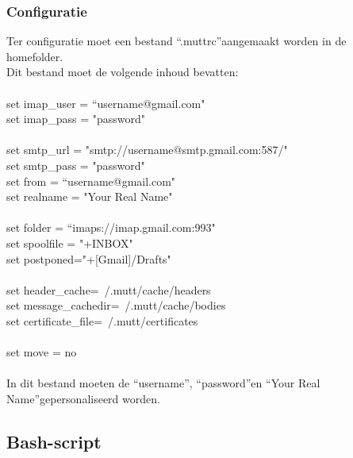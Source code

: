 \documentclass[12pt]{article}
\begin{document}
				\subsubsection{Configuratie}
					Ter configuratie moet een bestand \textquotedblleft .muttrc\textquotedblright aangemaakt worden in de homefolder.\\
					Dit bestand moet de volgende inhoud bevatten:\\
						\\
						set imap\_user = \textquotedblleft username@gmail.com"\\
						set imap\_pass = "password"\\
						\\
						set smtp\_url = "smtp://username@smtp.gmail.com:587/"\\
						set smtp\_pass = "password"\\
						set from = \textquotedblleft username@gmail.com"\\
						set realname = "Your Real Name"\\
						\\
						set folder = \textquotedblleft imaps://imap.gmail.com:993"\\
						set spoolfile = "+INBOX"\\
						set postponed="+[Gmail]/Drafts"\\
						\\
						set header\_cache=~/.mutt/cache/headers\\
						set message\_cachedir=~/.mutt/cache/bodies\\
						set certificate\_file=~/.mutt/certificates\\
						\\
						set move = no\\
						\\
					In dit bestand moeten de \textquotedblleft username\textquotedblright, \textquotedblleft password\textquotedblright en \textquotedblleft Your Real Name\textquotedblright 								gepersonaliseerd worden.\\
			\cite{Mail}
					
			\subsection{Bash-script}\label{Script}
\end{document}
